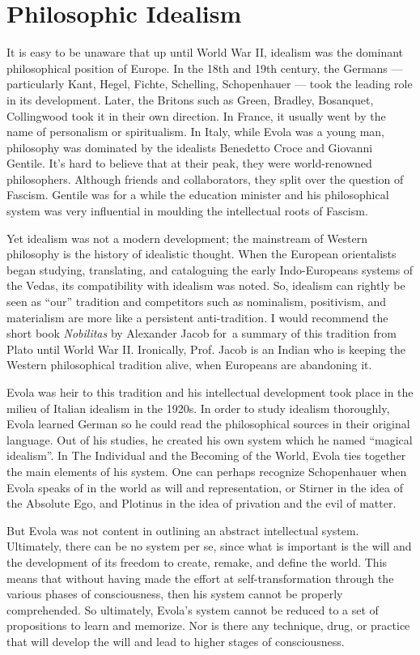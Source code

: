 \section{Philosophic Idealism}

It is easy to be unaware that up until World War II, idealism was the dominant philosophical position of Europe. In the
18th and 19th century, the Germans — particularly Kant, Hegel, Fichte, Schelling, Schopenhauer — took the leading role in its development. Later, the Britons such as Green, Bradley, Bosanquet, Collingwood took it in
their own direction. In France, it usually went by the name of personalism or spiritualism. In Italy, while Evola was a
young man, philosophy was dominated by the idealists Benedetto Croce and Giovanni Gentile. It’s hard to
believe that at their peak, they were world-renowned philosophers. Although friends and collaborators, they split over
the question of Fascism. Gentile was for a while the education minister and his philosophical system was very
influential in moulding the intellectual roots of Fascism.

Yet idealism was not a modern development; the mainstream of Western philosophy is the history of idealistic thought.
When the European orientalists began studying, translating, and cataloguing the early Indo-Europeans systems of the
Vedas, its compatibility with idealism was noted. So, idealism can rightly be seen as “our” tradition and competitors
such as nominalism, positivism, and materialism are more like a persistent anti-tradition. I would recommend the short
book \textit{Nobilitas} by Alexander Jacob for a summary of this tradition from Plato until World War II. Ironically, Prof.
Jacob is an Indian who is keeping the Western philosophical tradition alive, when Europeans are abandoning it.

Evola was heir to this tradition and his intellectual development took place in the milieu of Italian idealism in the
1920s. In order to study idealism thoroughly, Evola learned German so he could read the philosophical sources in their
original language. Out of his studies, he created his own system which he named “magical idealism”. In The Individual
and the Becoming of the World, Evola ties together the main elements of his system. One can perhaps recognize
Schopenhauer when Evola speaks of in the world as will and representation, or Stirner in the idea of the Absolute Ego,
and Plotinus in the idea of privation and the evil of matter.

But Evola was not content in outlining an abstract intellectual system. Ultimately, there can be no system per se, since
what is important is the will and the development of its freedom to create, remake, and define the world. This means
that without having made the effort at self-transformation through the various phases of consciousness, then his system
cannot be properly comprehended. So ultimately, Evola’s system cannot be reduced to a set of propositions
to learn and memorize. Nor is there any technique, drug, or practice that will develop the will and lead to higher
stages of consciousness.

